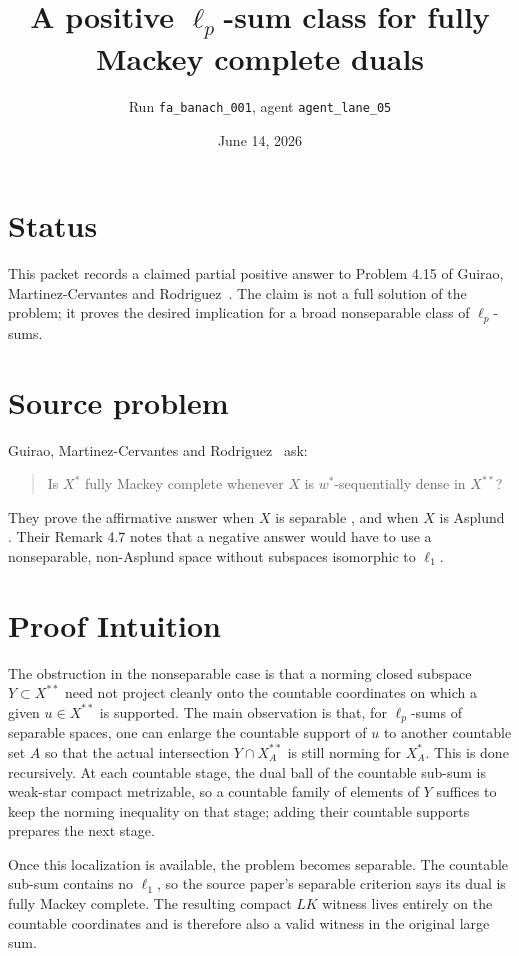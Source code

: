 \documentclass[11pt]{article}
\title{A positive \texorpdfstring{$\ell_p$}{ell-p}-sum class for fully Mackey complete duals}
\author{Run \texttt{fa\_banach\_001}, agent \texttt{agent\_lane\_05}}
\date{June 14, 2026}
\begin{document}
\maketitle

\section*{Status}

This packet records a claimed partial positive answer to Problem 4.15 of
Guirao, Martinez-Cervantes and Rodriguez~\cite{GMR}.  The claim is not a full
solution of the problem; it proves the desired implication for a broad
nonseparable class of $\ell_p$-sums.

\section*{Source problem}

Guirao, Martinez-Cervantes and Rodriguez~\cite[Problem 4.15]{GMR} ask:

\begin{quote}
Is $X^*$ fully Mackey complete whenever $X$ is $w^*$-sequentially dense in
$X^{**}$?
\end{quote}

They prove the affirmative answer when $X$ is separable
\cite[Corollary 4.8]{GMR}, and when $X$ is Asplund
\cite[Corollary 4.9]{GMR}.  Their Remark 4.7 notes that a negative answer
would have to use a nonseparable, non-Asplund space without subspaces
isomorphic to $\ell_1$.

\section*{Proof Intuition}

The obstruction in the nonseparable case is that a norming closed subspace
$Y\subset X^{**}$ need not project cleanly onto the countable coordinates on
which a given $u\in X^{**}$ is supported.  The main observation is that, for
$\ell_p$-sums of separable spaces, one can enlarge the countable support of
$u$ to another countable set $A$ so that the actual intersection
$Y\cap X_A^{**}$ is still norming for $X_A^*$.  This is done recursively.
At each countable stage, the dual ball of the countable sub-sum is weak-star
compact metrizable, so a countable family of elements of $Y$ suffices to keep
the norming inequality on that stage; adding their countable supports prepares
the next stage.

Once this localization is available, the problem becomes separable.  The
countable sub-sum contains no $\ell_1$, so the source paper's separable
criterion says its dual is fully Mackey complete.  The resulting compact
$LK$ witness lives entirely on the countable coordinates and is therefore also
a valid witness in the original large sum.
\end{document}
